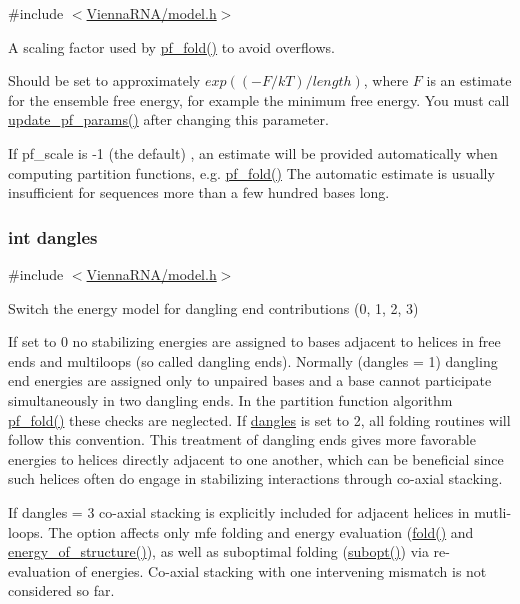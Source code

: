 {\ttfamily \#include $<$\hyperlink{model_8h}{Vienna\-R\-N\-A/model.\-h}$>$}



A scaling factor used by \hyperlink{group__pf__fold_gadc3db3d98742427e7001a7fd36ef28c2}{pf\-\_\-fold()} to avoid overflows. 

Should be set to approximately $exp{((-F/kT)/length)}$, where $F$ is an estimate for the ensemble free energy, for example the minimum free energy. You must call \hyperlink{group__pf__fold_ga384e927890f9c034ff09fa66da102d28}{update\-\_\-pf\-\_\-params()} after changing this parameter.\par
If pf\-\_\-scale is -\/1 (the default) , an estimate will be provided automatically when computing partition functions, e.\-g. \hyperlink{group__pf__fold_gadc3db3d98742427e7001a7fd36ef28c2}{pf\-\_\-fold()} The automatic estimate is usually insufficient for sequences more than a few hundred bases long. \hypertarget{group__model__details_ga72b511ed1201f7e23ec437e468790d74}{
\subsubsection[{dangles}]{\setlength{\rightskip}{0pt plus 5cm}int dangles}}\label{group__model__details_ga72b511ed1201f7e23ec437e468790d74}


{\ttfamily \#include $<$\hyperlink{model_8h}{Vienna\-R\-N\-A/model.\-h}$>$}



Switch the energy model for dangling end contributions (0, 1, 2, 3) 

If set to 0 no stabilizing energies are assigned to bases adjacent to helices in free ends and multiloops (so called dangling ends). Normally (dangles = 1) dangling end energies are assigned only to unpaired bases and a base cannot participate simultaneously in two dangling ends. In the partition function algorithm \hyperlink{group__pf__fold_gadc3db3d98742427e7001a7fd36ef28c2}{pf\-\_\-fold()} these checks are neglected. If \hyperlink{group__model__details_ga72b511ed1201f7e23ec437e468790d74}{dangles} is set to 2, all folding routines will follow this convention. This treatment of dangling ends gives more favorable energies to helices directly adjacent to one another, which can be beneficial since such helices often do engage in stabilizing interactions through co-\/axial stacking.\par
If dangles = 3 co-\/axial stacking is explicitly included for adjacent helices in mutli-\/loops. The option affects only mfe folding and energy evaluation (\hyperlink{group__mfe__fold__single_gaadafcb0f140795ae62e5ca027e335a9b}{fold()} and \hyperlink{group__eval_gaf93986cb3cb29770ec9cca69c9fab8cf}{energy\-\_\-of\-\_\-structure()}), as well as suboptimal folding (\hyperlink{group__subopt__wuchty_ga700f662506a233e42dd7fda74fafd40e}{subopt()}) via re-\/evaluation of energies. Co-\/axial stacking with one intervening mismatch is not considered so far.

